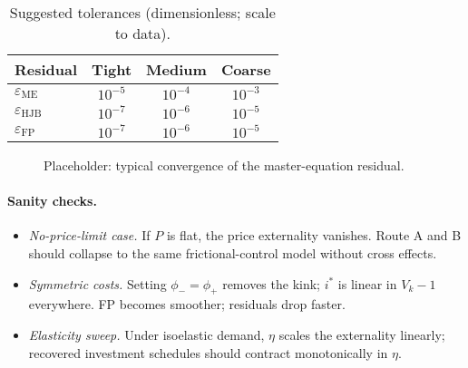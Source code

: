 ﻿\documentclass[11pt,letterpaper,oneside]{article}
\numberwithin{equation}{section}
\newcommand{\1}{\mathbf{1}}
\begin{document}
\begin{table}[ht]
\centering
\small
\begin{tabular}{@{}lccc@{}}
\toprule
Residual & Tight & Medium & Coarse \\
\midrule
$\varepsilon_{\mathrm{ME}}$ & $10^{-5}$ & $10^{-4}$ & $10^{-3}$ \\
$\varepsilon_{\mathrm{HJB}}$ & $10^{-7}$ & $10^{-6}$ & $10^{-5}$ \\
$\varepsilon_{\mathrm{FP}}$  & $10^{-7}$ & $10^{-6}$ & $10^{-5}$ \\
\bottomrule
\end{tabular}
\caption{Suggested tolerances (dimensionless; scale to data).}
\end{table}

\begin{figure}[ht]
\centering
{}
\caption{Placeholder: typical convergence of the master-equation residual.}
\end{figure}

\paragraph{Sanity checks.}
\begin{itemize}[leftmargin=1.25em]
\item \emph{No-price-limit case.} If $P$ is flat, the price externality vanishes. Route A and B should collapse to the same frictional-control model without cross effects.
\item \emph{Symmetric costs.} Setting $\phi_-=\phi_+$ removes the kink; $i^*$ is linear in $V_k-1$ everywhere. FP becomes smoother; residuals drop faster.
\item \emph{Elasticity sweep.} Under isoelastic demand, $\eta$ scales the externality linearly; recovered investment schedules should contract monotonically in $\eta$.
\end{itemize}

\end{document}
